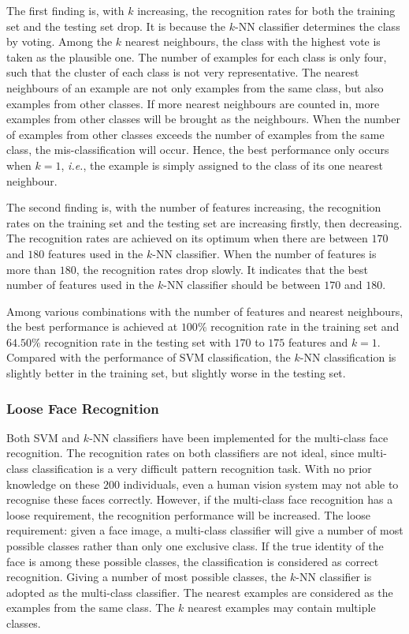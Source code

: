 The first finding is, with $k$ increasing, the recognition rates for both the training set and the testing set drop. It is because the $k$-NN classifier determines the class by voting. Among the $k$ nearest neighbours, the class with the highest vote is taken as the plausible one. The number of examples for each class is only four, such that the cluster of each class is not very representative. The nearest neighbours of an example are not only examples from the same class, but also examples from other classes. If more nearest neighbours are counted in, more examples from other classes will be brought as the neighbours. When the number of examples from other classes exceeds the number of examples from the same class, the mis-classification will occur. Hence, the best performance only occurs when $k =1$, \textit{i.e.}, the example is simply assigned to the class of its one nearest neighbour. 

The second finding is, with the number of features increasing, the recognition rates on the training set and the testing set are increasing firstly, then decreasing. The recognition rates are achieved on its optimum when there are between $170$ and $180$ features used in the $k$-NN classifier. When the number of features is more than $180$, the recognition rates drop slowly. It indicates that the best number of features used in the $k$-NN classifier should be between $170$ and $180$.

Among various combinations with the number of features and nearest neighbours, the best performance is achieved at $100\%$ recognition rate in the training set and $64.50\%$ recognition rate in the testing set with $170$ to $175$ features and $k=1$. Compared with the performance of SVM classification, the $k$-NN classification is slightly better in the training set, but slightly worse in the testing set.

\subsubsection{Loose Face Recognition}
Both SVM and $k$-NN classifiers have been implemented for the multi-class face recognition. The recognition rates on both classifiers are not ideal, since multi-class classification is a very difficult pattern recognition task. With no prior knowledge on these $200$ individuals, even a human vision system may not able to recognise these faces correctly. However, if the multi-class face recognition has a loose requirement, the recognition performance will be increased. The loose requirement: given a face image, a multi-class classifier will give a number of most possible classes rather than only one exclusive class. If the true identity of the face is among these possible classes, the classification is considered as correct recognition. Giving a number of most possible classes, the $k$-NN classifier is adopted as the multi-class classifier. The nearest examples are considered as the examples from the same class. The $k$ nearest examples may contain multiple classes.

